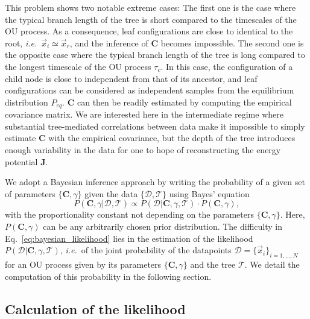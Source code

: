 \documentclass[preprint,amsmath,amssymb,superscriptaddress,showpacs,pre]{revtex4-1}
\newcommand{\ie}{\emph{i.e.}}
\def\vx{\vec x}
\begin{document}
This problem shows two notable extreme cases: 
The first one is the case where the typical branch length of the tree is short compared to the timescales of the OU process.
As a consequence, leaf configurations are close to identical to the root, \ie~$\vx_i\simeq\vx_r$, and the inference of $\bm C$ becomes impossible. 
The second one is the opposite case where the typical branch length of the tree is long compared to the longest timescale of the OU process $\tau_c$.
In this case, the configuration of a child node is close to independent from that of its ancestor, and leaf configurations can be considered as independent samples from the equilibrium distribution $P_{eq}$.
$\bm C$ can then be readily estimated by computing the empirical covariance matrix. 
We are interested here in the intermediate regime where substantial tree-mediated correlations between data
make it impossible to simply estimate $\bm C$ with the empirical covariance, but the depth of the tree introduces enough variability in the data for one to hope of reconstructing the energy potential $\bm{J}$.

We adopt a Bayesian inference approach by writing the probability of a given set of parameters $\{\bm C, \gamma\}$ given the data $\{\mathcal{D},\mathcal{T}\}$ using Bayes' equation
\begin{equation}
	P(\bm C, \gamma\vert\mathcal{D},\mathcal{T}) \propto P(\mathcal{D}\vert\bm C, \gamma,\mathcal{T})\cdot P(\bm C, \gamma),
	\label{eq:bayesian_likelihood}
\end{equation}
with the proportionality constant not depending on the parameters $\{\bm C, \gamma\}$. Here, $P(\bm C, \gamma)$ can be any arbitrarily chosen prior distribution. The difficulty in Eq.~\eqref{eq:bayesian_likelihood} lies in the estimation of the likelihood $P(\mathcal{D}\vert\bm C, \gamma, \mathcal{T})$,
\ie~of the joint probability of the datapoints $\mathcal{D}=\{\vx_i\}_{i=1,...,N}$ for an OU process given by its parameters $\{\bm C, \gamma\}$ and the tree $\mathcal{T}$.  We detail the computation of this probability in the following section. 

\subsection{Calculation of the likelihood} %
\label{sub:Calculation_of_the_likelihood}
\end{document}
